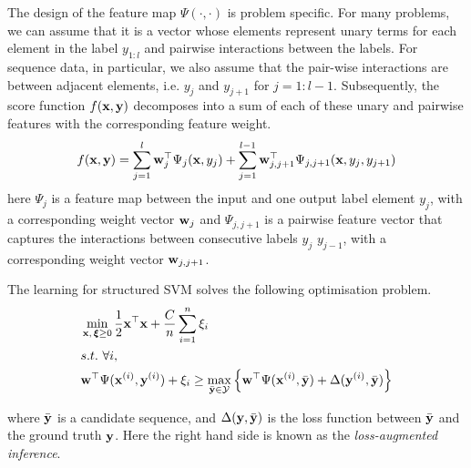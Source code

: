 The design of the feature map $\Psi(\cdot,\cdot)$ is problem specific. 
For many problems, we can assume that it is a vector whose elements represent unary 
 terms for each element in the label $y_{1:l}$ and pairwise interactions between the labels. 
 For sequence data, in particular, we also assume that the pair-wise interactions are between 
 adjacent elements, i.e. $y_j$ and $y_{j+1}$ for $j=1:l-1$. 
 Subsequently, the score function $f(\mathbf{x},\mathbf{y})$ decomposes into a sum of 
 each of these unary and pairwise features with the corresponding feature weight.  
\begin{align}
\label{eq:jointfeature}
f(\x, \y) =  %
\sum_{j=1}^l \w_j^\top \Psi_j(\x, y_j)  
  + \sum_{j=1}^{l-1} \w_{j,j+1}^\top \Psi_{j,j+1}(\x, y_{j}, y_{j+1}) %
\end{align}
here $\Psi_j$ is a feature map between the input and one output label element $y_j$, with a corresponding weight vector $\mathbf{w}_j$
and $\Psi_{j,j+1}$ is a pairwise feature vector that captures the interactions between consecutive labels $y_j$ $y_{j-1}$, 
with a corresponding weight vector $\mathbf{w}_{j,j+1}$.

The learning for structured SVM solves the following optimisation problem.
\begin{align}
&\min_{\mathbf{x}, \, \bm{\xi} \ge 0} \frac{1}{2} \mathbf{x}^\top \mathbf{x} + \frac{C}{n} \sum_{i=1}^n \xi_i \label{eq:nslack}\\
&s.t.~  \forall i, \nonumber\\
&\mathbf{w}^\top \Psi(\mathbf{x}^{(i)}, \mathbf{y}^{(i)}) + \xi_i \ge
          \max_{\bar{\mathbf{y}} \in \mathcal{Y}}
          \left\{\mathbf{w}^\top \Psi(\mathbf{x}^{(i)}, \bar{\mathbf{y}}) + \Delta(\mathbf{y}^{(i)}, \bar{\mathbf{y}}) \right\} \nonumber
\end{align}

where $\bar{\mathbf{y}}$ is a candidate sequence,  %
and $\Delta(\mathbf{y}, \bar{\mathbf{y}})$ is the loss function between $\bar{\mathbf{y}}$ and the ground truth $\mathbf{y}$. 
Here the right hand side is known as the \emph{loss-augmented inference}.

